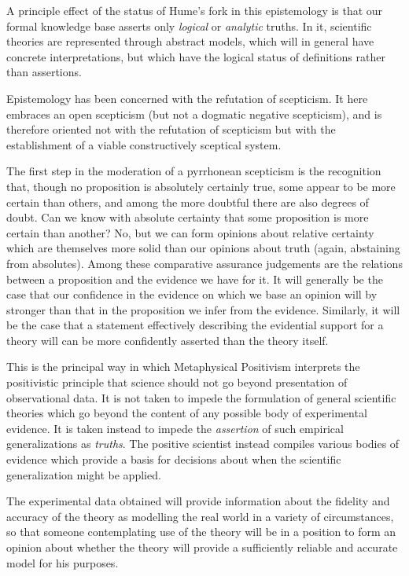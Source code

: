 A principle effect of the status of Hume's fork in this epistemology
is that our formal knowledge base asserts only \emph{logical} or
\emph{analytic} truths.
In it, scientific theories are represented through abstract models,
which will in general have concrete interpretations, but which have
the logical status of definitions rather than assertions.

Epistemology has been concerned with the refutation of scepticism.
It here embraces an open scepticism (but not a dogmatic negative
scepticism), and is therefore oriented not with the refutation of
scepticism but with the establishment of a viable constructively
sceptical system.

The first step in the moderation of a pyrrhonean scepticism is the
recognition that, though no proposition is absolutely certainly true,
some appear to be more certain than others, and among the more
doubtful there are also degrees of doubt.
Can we know with absolute certainty that some proposition is more
certain than another?
No, but we can form opinions about relative certainty which are
themselves more solid than our opinions about truth (again, abstaining
from absolutes).
Among these comparative assurance judgements are the relations between
a proposition and the evidence we have for it.
It will generally be the case that our confidence in the evidence on
which we base an opinion will by stronger than that in the proposition
we infer from the evidence.
Similarly, it will be the case that a statement effectively describing
the evidential support for a theory will can be more confidently
asserted than the theory itself.

This is the principal way in which Metaphysical Positivism interprets
the positivistic principle that science should not go beyond
presentation of observational data.
It is not taken to impede the formulation of general scientific
theories which go beyond the content of any possible body of
experimental evidence.
It is taken instead to impede the \emph{assertion} of such empirical
generalizations as \emph{truths}.
The positive scientist instead compiles various bodies of evidence
which provide a basis for decisions about when the scientific
generalization might be applied.

The experimental data obtained will provide information about the
fidelity and accuracy of the theory as modelling the real world in a
variety of circumstances, so that someone contemplating use of the
theory will be in a position to form an opinion about whether the
theory will provide a sufficiently reliable and accurate model for his
purposes.

